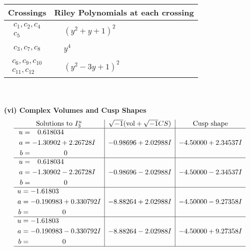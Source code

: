 \documentclass[1p]{elsarticle_modified}
\theoremstyle{definition}
\newcommand{\I}{\sqrt{-1}}
\begin{document}
\begin{tabular}{m{50pt}|m{274pt}}
Crossings & \hspace{64pt}Riley Polynomials at each crossing \\
\hline $$\begin{aligned}c_{1},c_{2},c_{4}\\c_{5}\end{aligned}$$&$\begin{aligned}
&(y^2+y+1)^2
\end{aligned}$\\
\hline $$\begin{aligned}c_{3},c_{7},c_{8}\end{aligned}$$&$\begin{aligned}
&y^4
\end{aligned}$\\
\hline $$\begin{aligned}c_{6},c_{9},c_{10}\\c_{11},c_{12}\end{aligned}$$&$\begin{aligned}
&(y^2-3 y+1)^2
\end{aligned}$\\
\hline
\end{tabular}\\~\\
\newpage\flushleft \textbf{(vi) Complex Volumes and Cusp Shapes}
$$\begin{array}{c|c|c}  
\text{Solutions to }I^u_{3}& \I (\text{vol} + \sqrt{-1}CS) & \text{Cusp shape}\\
 \hline 
\begin{aligned}
u &= \phantom{-}0.618034\phantom{ +0.000000I} \\
a &= -1.30902 + 2.26728 I \\
b &= \phantom{-0.000000 } 0\end{aligned}
 & -0.98696 + 2.02988 I & -4.50000 + 2.34537 I \\ \hline\begin{aligned}
u &= \phantom{-}0.618034\phantom{ +0.000000I} \\
a &= -1.30902 - 2.26728 I \\
b &= \phantom{-0.000000 } 0\end{aligned}
 & -0.98696 - 2.02988 I & -4.50000 - 2.34537 I \\ \hline\begin{aligned}
u &= -1.61803\phantom{ +0.000000I} \\
a &= -0.190983 + 0.330792 I \\
b &= \phantom{-0.000000 } 0\end{aligned}
 & -8.88264 + 2.02988 I & -4.50000 - 9.27358 I \\ \hline\begin{aligned}
u &= -1.61803\phantom{ +0.000000I} \\
a &= -0.190983 - 0.330792 I \\
b &= \phantom{-0.000000 } 0\end{aligned}
 & -8.88264 - 2.02988 I & -4.50000 + 9.27358 I\\
 \hline 
 \end{array}$$\newpage
\end{document}
